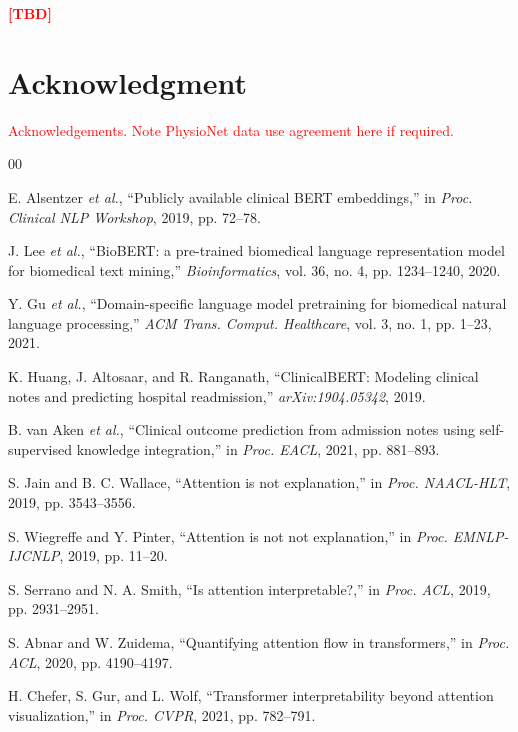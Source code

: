 \documentclass[conference]{IEEEtran}
\newif\ifdraftnums\draftnumstrue   %
\newcommand{\TBD}{\ifdraftnums\textcolor{red}{\textbf{[TBD]}}\else--\fi}
\newcommand{\ph}[1]{\ifdraftnums\textcolor{red}{#1}\else#1\fi}
\begin{document}
\TBD

\section*{Acknowledgment}
\ph{Acknowledgements. Note PhysioNet data use agreement here if required.}

\begin{thebibliography}{00}

 E. Alsentzer \emph{et al.}, ``Publicly available clinical BERT embeddings,'' in \emph{Proc. Clinical NLP Workshop}, 2019, pp. 72--78.

 J. Lee \emph{et al.}, ``BioBERT: a pre-trained biomedical language representation model for biomedical text mining,'' \emph{Bioinformatics}, vol. 36, no. 4, pp. 1234--1240, 2020.

 Y. Gu \emph{et al.}, ``Domain-specific language model pretraining for biomedical natural language processing,'' \emph{ACM Trans. Comput. Healthcare}, vol. 3, no. 1, pp. 1--23, 2021.

 K. Huang, J. Altosaar, and R. Ranganath, ``ClinicalBERT: Modeling clinical notes and predicting hospital readmission,'' \emph{arXiv:1904.05342}, 2019.

 B. van Aken \emph{et al.}, ``Clinical outcome prediction from admission notes using self-supervised knowledge integration,'' in \emph{Proc. EACL}, 2021, pp. 881--893.

 S. Jain and B. C. Wallace, ``Attention is not explanation,'' in \emph{Proc. NAACL-HLT}, 2019, pp. 3543--3556.

 S. Wiegreffe and Y. Pinter, ``Attention is not not explanation,'' in \emph{Proc. EMNLP-IJCNLP}, 2019, pp. 11--20.

 S. Serrano and N. A. Smith, ``Is attention interpretable?,'' in \emph{Proc. ACL}, 2019, pp. 2931--2951.

 S. Abnar and W. Zuidema, ``Quantifying attention flow in transformers,'' in \emph{Proc. ACL}, 2020, pp. 4190--4197.

 H. Chefer, S. Gur, and L. Wolf, ``Transformer interpretability beyond attention visualization,'' in \emph{Proc. CVPR}, 2021, pp. 782--791.


\end{thebibliography}
\end{document}
